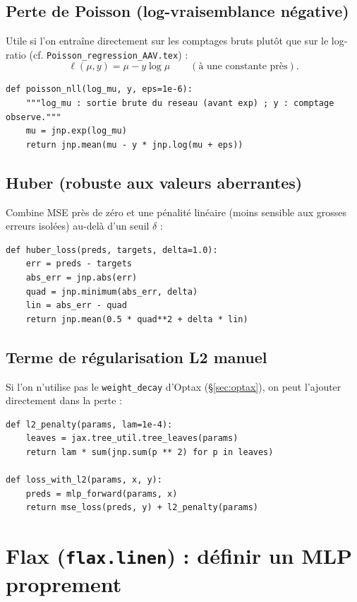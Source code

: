 \documentclass[11pt,a4paper]{article}
\begin{document}
\subsection{Perte de Poisson (log-vraisemblance négative)}
Utile si l'on entraîne directement sur les comptages bruts plutôt que sur le
log-ratio (cf. \texttt{Poisson\_regression\_AAV.tex}) :
\[
    \ell(\mu, y) = \mu - y\log\mu \qquad (\text{à une constante près}).
\]
\begin{lstlisting}
def poisson_nll(log_mu, y, eps=1e-6):
    """log_mu : sortie brute du reseau (avant exp) ; y : comptage observe."""
    mu = jnp.exp(log_mu)
    return jnp.mean(mu - y * jnp.log(mu + eps))
\end{lstlisting}

\subsection{Huber (robuste aux valeurs aberrantes)}
Combine MSE près de zéro et une pénalité linéaire (moins sensible aux
grosses erreurs isolées) au-delà d'un seuil $\delta$ :
\begin{lstlisting}
def huber_loss(preds, targets, delta=1.0):
    err = preds - targets
    abs_err = jnp.abs(err)
    quad = jnp.minimum(abs_err, delta)
    lin = abs_err - quad
    return jnp.mean(0.5 * quad**2 + delta * lin)
\end{lstlisting}

\subsection{Terme de régularisation L2 manuel}
Si l'on n'utilise pas le \texttt{weight\_decay} d'Optax (\S\ref{sec:optax}),
on peut l'ajouter directement dans la perte :
\begin{lstlisting}
def l2_penalty(params, lam=1e-4):
    leaves = jax.tree_util.tree_leaves(params)
    return lam * sum(jnp.sum(p ** 2) for p in leaves)

def loss_with_l2(params, x, y):
    preds = mlp_forward(params, x)
    return mse_loss(preds, y) + l2_penalty(params)
\end{lstlisting}

\section{Flax (\texttt{flax.linen}) : définir un MLP proprement}
\end{document}
